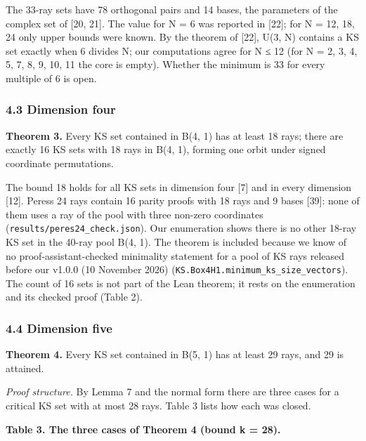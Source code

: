 \documentclass[11pt,a4paper]{article}
\begin{document}
The 33-ray sets have 78 orthogonal pairs and 14 bases, the parameters of the complex set of {[}20, 21{]}.
The value for N = 6 was reported in {[}22{]}; for N = 12, 18, 24 only upper bounds were known. By the
theorem of {[}22{]}, U(3, N) contains a KS set exactly when 6 divides N; our computations agree for
N ≤ 12 (for N = 2, 3, 4, 5, 7, 8, 9, 10, 11 the core is empty). Whether the minimum is 33 for every
multiple of 6 is open.

\subsubsection{4.3 Dimension four}\label{43-dimension-four}

\textbf{Theorem 3.} Every KS set contained in B(4, 1) has at least 18 rays; there are exactly 16 KS sets with
18 rays in B(4, 1), forming one orbit under signed coordinate permutations.

The bound 18 holds for all KS sets in dimension four {[}7{]} and in every dimension {[}12{]}. Peres\textquotesingle s 24 rays
contain 16 parity proofs with 18 rays and 9 bases {[}39{]}: none of them uses a ray of the pool with
three non-zero coordinates (\texttt{results/peres24\_check.json}). Our enumeration shows there is no other
18-ray KS set in the 40-ray pool B(4, 1). The theorem is included because we know of no
proof-assistant-checked minimality statement for a pool of KS rays released before our v1.0.0
(10 November 2026) (\texttt{KS.Box4H1.minimum\_ks\_size\_vectors}). The count of 16 sets is not part of
the Lean theorem; it rests on the enumeration and its checked proof (Table 2).

\subsubsection{4.4 Dimension five}\label{44-dimension-five}

\textbf{Theorem 4.} Every KS set contained in B(5, 1) has at least 29 rays, and 29 is attained.

\emph{Proof structure.} By Lemma 7 and the normal form there are three cases for a critical KS set with at
most 28 rays. Table 3 lists how each was closed.

\textbf{Table 3. The three cases of Theorem 4 (bound k = 28).}
\end{document}

